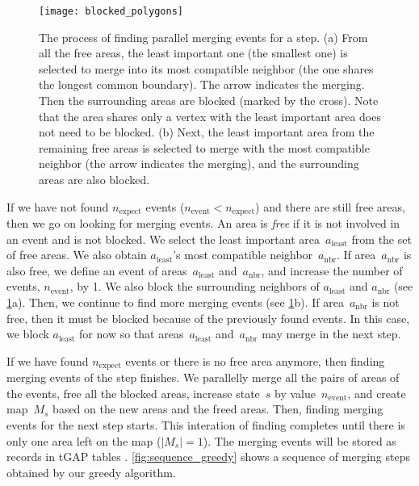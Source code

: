 \documentclass[ijgi,article,submit,moreauthors,pdftex]{Definitions/mdpi}
\begin{document}
\begin{figure}[tb]
\centering
\texttt{[image: blocked\_polygons]}
\caption{The process of finding parallel merging events for a step.
    (a) From all the free areas,
	the least important one (the smallest one) is selected to merge into
	its most compatible neighbor (the one shares the longest common boundary).
    The arrow indicates the merging.
	Then the surrounding areas are blocked (marked by the cross).
    Note that the area shares only a vertex with the least important area 
    does not need to be blocked.
	(b) Next, the least important area from the remaining free areas
	is selected to merge with the most compatible neighbor
	(the arrow indicates the merging),
	and the surrounding areas are also blocked.
}
\label{fig:blocked_polygons}
\end{figure}

If we have not found $n_\mathrm{expect}$ events 
($n_\mathrm{event} < n_\mathrm{expect}$)
and there are still free areas,
then we go on looking for merging events.
An area is \emph{free} if 
it is not involved in an event and is not blocked.
We select the least important area~$a_\mathrm{least}$
from the set of free areas.
We also obtain $a_\mathrm{least}$'s 
most compatible neighbor~$a_\mathrm{nbr}$.
If area~$a_\mathrm{nbr}$ is also free, 
we define an event of areas~$a_\mathrm{least}$ and~$a_\mathrm{nbr}$,
and increase the number of events, $n_\mathrm{event}$, by 1.
We also block the surrounding neighbors of $a_\mathrm{least}$ and $a_\mathrm{nbr}$
(see \fig\ref{fig:blocked_polygons}a).
Then, we continue to find more merging events
(see \fig\ref{fig:blocked_polygons}b).
If area~$a_\mathrm{nbr}$ is not free,
then it must be blocked because of the previously found events.
In this case, we block $a_\mathrm{least}$ for now
so that areas~$a_\mathrm{least}$ and~$a_\mathrm{nbr}$ 
may merge in the next step.

If we have found $n_\mathrm{expect}$ events 
or there is no free area anymore,
then finding merging events of the step finishes.
We parallelly merge all the pairs of areas of the events,
free all the blocked areas,
increase state~$s$ by value~$n_\mathrm{event}$,
and create map~$M_s$ based on the new areas and the freed areas.
Then, finding merging events for the next step starts.
This interation of finding completes 
until there is only one area left on the map ($|M_s|=1$).
The merging events will be stored as records in tGAP tables
\citep[see][]{Meijers2011Thesis}.
\fig\ref{fig:sequence_greedy} shows a sequence of merging steps
obtained by our greedy algorithm.
\end{document}

